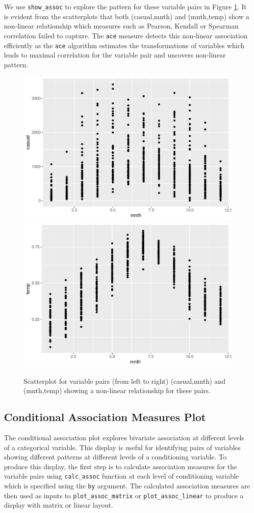 We use \texttt{show\_assoc} to explore the pattern for these variable pairs in Figure \ref{fig:int-pairs-multiple}. It is evident from the scatterplots that both (casual,mnth) and (mnth,temp) show a non-linear relationship which measures such as Pearson, Kendall or Spearman correlation failed to capture. The \texttt{ace} measure detects this non-linear association efficiently as the \texttt{ace} algorithm estimates the transformations of variables which leads to maximal correlation for the variable pair and uncovers non-linear pattern.

\begin{figure}
\includegraphics[width=0.5\linewidth]{rjpaperCHMar22_files/figure-latex/int-pairs-multiple-1} \includegraphics[width=0.5\linewidth]{rjpaperCHMar22_files/figure-latex/int-pairs-multiple-2} \caption{Scatterplot for variable pairs (from left to right) (casual,mnth) and (mnth,temp) showing a non-linear relationship for these pairs.}\label{fig:int-pairs-multiple}
\end{figure}

\hypertarget{conditional-association-measures-plot}{%
\subsection{Conditional Association Measures Plot}\label{conditional-association-measures-plot}}

The conditional association plot explores bivariate association at different levels of a categorical variable. This display is useful for identifying pairs of variables showing different patterns at different levels of a conditioning variable. To produce this display, the first step is to calculate association measures for the variable pairs using \texttt{calc\_assoc} function at each level of conditioning variable which is specified using the \texttt{by} argument. The calculated association measures are then used as inputs to \texttt{plot\_assoc\_matrix} or \texttt{plot\_assoc\_linear} to produce a display with matrix or linear layout.

